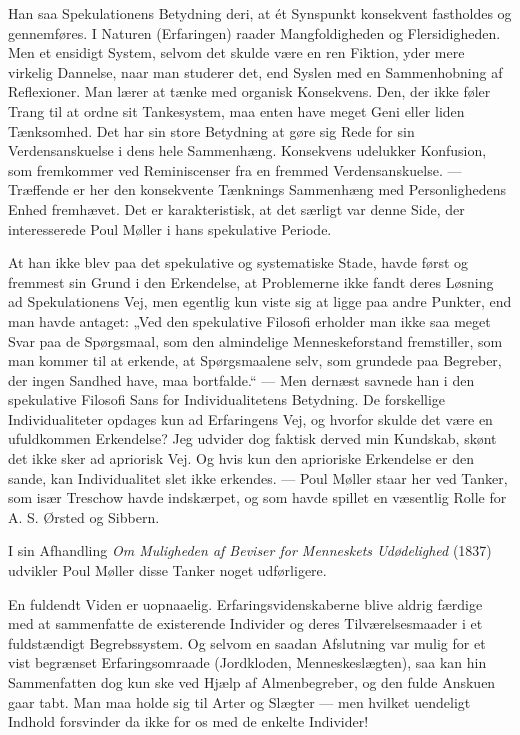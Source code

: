 \documentclass[12pt,a4paper,openany]{book}
\newcommand{\opage}[1]{\marginnote{\footnotesize\textit{[#1]}}}
\begin{document}
Han saa Spekulationens Betydning deri, at ét Synspunkt konsekvent fastholdes og
gennemføres. I Naturen (Erfaringen) raader Mangfoldigheden og Flersidigheden.
Men et ensidigt System, selvom det skulde være en ren Fiktion, yder mere
virkelig Dannelse, naar man studerer det, end Syslen med en Sammenhobning af
Reflexioner. Man lærer at tænke med organisk Konsekvens. Den, der ikke føler
Trang til at ordne sit Tankesystem, maa enten have meget Geni eller liden
Tænksomhed. Det har sin store Betydning at gøre sig Rede for sin
Verdensanskuelse i dens hele Sammenhæng. Konsekvens udelukker Konfusion, som
fremkommer ved Reminiscenser fra en fremmed Verdensanskuelse. --- Træffende er
her den konsekvente Tænknings Sammenhæng med Personlighedens Enhed fremhævet.
Det er karakteristisk, at det særligt var denne Side, der interesserede Poul
Møller i hans spekulative Periode.

At han ikke blev paa det spekulative og systematiske Stade, havde først og
fremmest sin Grund i den Erkendelse, at Problemerne ikke fandt deres Løsning ad
Spekulationens Vej, men egentlig kun viste sig at ligge paa andre Punkter, end
man havde antaget: „Ved den spekulative Filosofi erholder man ikke saa meget
Svar paa de Spørgsmaal, som den almindelige Menneskeforstand fremstiller, som
man kommer
\setcounter{footnote}{0}%
\opage{120}til at erkende, at Spørgsmaalene selv, som grundede paa Begreber,
der ingen Sandhed have, maa bortfalde.“ --- Men dernæst savnede han i den
spekulative Filosofi Sans for Individualitetens Betydning. De forskellige
Individualiteter opdages kun ad Erfaringens Vej, og hvorfor skulde det være en
ufuldkommen Erkendelse? Jeg udvider dog faktisk derved min Kundskab, skønt det
ikke sker ad apriorisk Vej. Og hvis kun den aprioriske Erkendelse er den sande,
kan Individualitet slet ikke erkendes. --- Poul Møller staar her ved Tanker,
som især Treschow havde indskærpet, og som havde spillet en væsentlig Rolle for
A. S. Ørsted og Sibbern.

I sin Afhandling \textit{Om Muligheden af Beviser for Menneskets Udødelighed}
(1837) udvikler Poul Møller disse Tanker noget udførligere.

En fuldendt Viden er uopnaaelig. Erfaringsvidenskaberne blive aldrig færdige
med at sammenfatte de existerende Individer og deres Tilværelsesmaader i et
fuldstændigt Begrebssystem. Og selvom en saadan Afslutning var mulig for et
vist begrænset Erfaringsomraade (Jordkloden, Menneskeslægten), saa kan hin
Sammenfatten dog kun ske ved Hjælp af Almenbegreber, og den fulde Anskuen gaar
tabt. Man maa holde sig til Arter og Slægter --- men hvilket uendeligt Indhold
forsvinder da ikke for os med de enkelte Individer!
\end{document}
